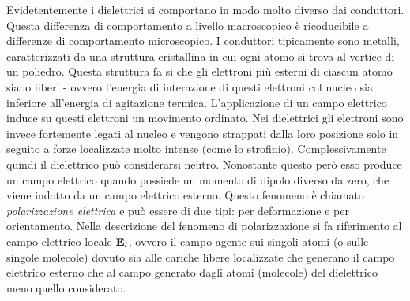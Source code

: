 Evidetentemente i dielettrici si comportano in modo molto diverso dai conduttori. Questa differenza di comportamento
a livello macroscopico è ricoducibile a differenze di comportamento microscopico. I conduttori tipicamente sono metalli,
caratterizzati da una struttura cristallina in cui ogni atomo si trova al vertice di un poliedro.
Questa struttura fa si che gli elettroni più esterni di ciascun atomo siano liberi
- ovvero l'energia di interazione di questi elettroni col nucleo sia inferiore all'energia di agitazione termica.
L'applicazione di un campo elettrico induce su questi elettroni un movimento ordinato. Nei dielettrici
gli elettroni sono invece fortemente legati al nucleo e vengono strappati dalla loro posizione
solo in seguito a forze localizzate molto intense (come lo strofinio). Complessivamente quindi il dielettrico
può considerarsi neutro. Nonostante questo però esso produce un campo elettrico quando possiede un momento di dipolo diverso da zero,
che viene indotto da un campo elettrico esterno. Questo fenomeno è chiamato
\textit{polarizzazione elettrica} e può essere di due tipi: per deformazione e per orientamento.
Nella descrizione del fenomeno di polarizzazione si fa riferimento al campo elettrico locale $\vb{E}_l$,
ovvero il campo agente sui singoli atomi (o sulle singole molecole) dovuto sia alle cariche libere localizzate
che generano il campo elettrico esterno che al campo generato dagli atomi (molecole) del dielettrico meno quello considerato.
